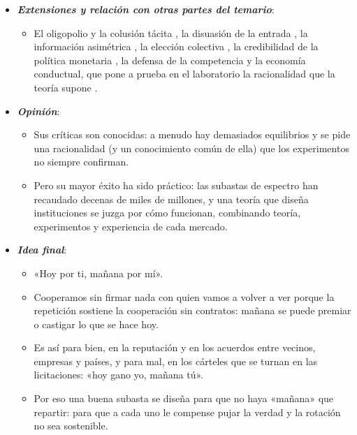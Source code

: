 \documentclass[11pt]{article}
\begin{document}
\begin{itemize}
\begin{itemize}
\begin{itemize}
    \item {}, por qué los formatos que revelan información dan más ingreso esperado con valores afiliados, y
    \item los 2~idearon formatos para vender a la vez muchos objetos relacionados por cuenta de un vendedor que busca la eficiencia y no la máxima recaudación\nocite{Nobel2020PressRelease}.
    \end{itemize}
  \item Con ellos se vende el espectro en medio mundo, también en España\nocite{Nobel2020Scientific};  estudió además la tarificación no lineal de los servicios públicos\nocite{Wilson1993Nonlinear}.
  \end{itemize}
\item \textbf{\emph{Extensiones y relación con otras partes del temario}}:
  \begin{itemize}
  \item El oligopolio y la colusión tácita , la disuasión de la entrada , la información asimétrica , la elección colectiva , la credibilidad de la política monetaria , la defensa de la competencia  y la economía conductual, que pone a prueba en el laboratorio la racionalidad que la teoría supone .
  \end{itemize}
\item \textbf{\emph{Opinión}}:
  \begin{itemize}
  \item Sus críticas son conocidas: a menudo hay demasiados equilibrios y se pide una racionalidad (y un conocimiento común de ella) que los experimentos no siempre confirman.
  \item Pero su mayor éxito ha sido práctico: las subastas de espectro han recaudado decenas de miles de millones, y una teoría que diseña instituciones se juzga por cómo funcionan, combinando teoría, experimentos y experiencia de cada mercado\nocite{Klemperer2002WhatReallyMatters}.
  \end{itemize}
\item \textbf{\emph{Idea final}}:
  \begin{itemize}
  \item «Hoy por ti, mañana por mí».

  \item Cooperamos sin firmar nada con quien vamos a volver a ver porque la repetición sostiene la cooperación sin contratos: mañana se puede premiar o castigar lo que se hace hoy.

  \item Es así para bien, en la reputación y en los acuerdos entre vecinos, empresas y países, y para mal, en los cárteles que se turnan en las licitaciones: «hoy gano yo, mañana tú».

  \item Por eso una buena subasta se diseña para que no haya «mañana» que repartir: para que a cada uno le compense pujar la verdad y la rotación no sea sostenible.
  \end{itemize}
\end{itemize}
\end{document}
